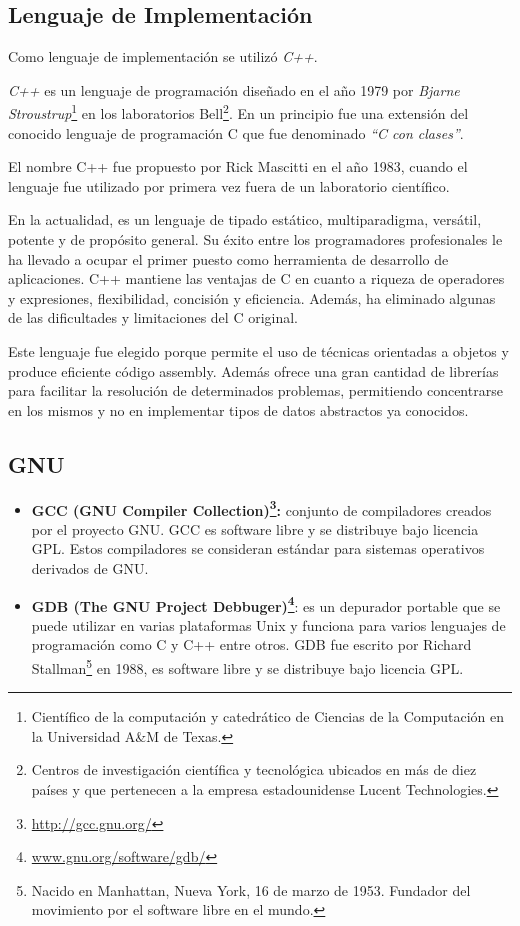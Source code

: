 \subsection{Lenguaje de Implementación}
\par Como lenguaje de implementación se utilizó \emph{C++}\cite{cplusplus}. 
\par \textit{C++}  es un lenguaje de programación diseñado en el año 1979 por \emph{Bjarne Stroustrup}\footnote{Científico de la computación y catedrático de Ciencias de la Computación en la Universidad A\&M de Texas.} en los laboratorios Bell\footnote{Centros de investigación científica y tecnológica ubicados en más de diez países y que pertenecen a la empresa estadounidense Lucent Technologies.}. En un principio fue una extensión del conocido lenguaje de programación C que fue denominado \emph{``C con clases''}. 

\par El nombre C++ fue propuesto por Rick Mascitti en el año 1983, cuando el lenguaje fue utilizado por primera vez fuera de un laboratorio científico. 

\par En la actualidad, es un lenguaje de tipado estático, multiparadigma, versátil, potente y de propósito general. Su éxito entre los programadores profesionales le ha llevado a ocupar el primer puesto como herramienta de desarrollo de aplicaciones. C++ mantiene las ventajas de C en cuanto a riqueza de operadores y expresiones, flexibilidad, concisión y eficiencia. Además, ha eliminado algunas de las dificultades y limitaciones del C original.

\par Este lenguaje fue elegido porque permite el uso de técnicas orientadas a objetos y produce eficiente código assembly. Además ofrece una gran cantidad de librerías para facilitar la resolución de determinados problemas, permitiendo concentrarse en los mismos y no en implementar tipos de datos abstractos ya conocidos.

\subsection{GNU}
\begin{itemize}
	\item \textbf{GCC (GNU Compiler Collection)\footnote{\url{http://gcc.gnu.org/}}:} conjunto de compiladores creados por el proyecto GNU.
     \textsc{GCC} es software libre y se distribuye bajo licencia \textsc{GPL}. Estos compiladores se
     consideran estándar para sistemas operativos derivados de GNU.

	\item \textbf{GDB (The GNU Project Debbuger)\footnote{\url{www.gnu.org/software/gdb/}}}: es un depurador portable que se puede utilizar en varias plataformas Unix y funciona para varios lenguajes de programación como C y C++ entre otros. \textsc{GDB} fue escrito por Richard 
    Stallman\footnote{Nacido en Manhattan, Nueva York, 16 de marzo de 1953. Fundador del movimiento por el software libre en el mundo.} en 1988, es software libre y se distribuye bajo licencia GPL. 
\end{itemize}	
	
